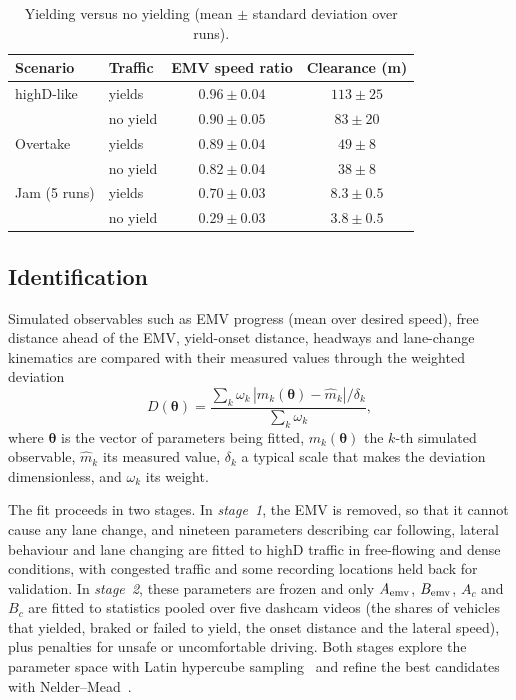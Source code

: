 \documentclass[conference,a4paper]{IEEEtran}
\begin{document}
\begin{table}[t]
\caption{Yielding versus no yielding (mean $\pm$ standard deviation over runs).}
\label{tab:res}
\centering\footnotesize\setlength{\tabcolsep}{3pt}
\begin{tabular}{@{}llcc@{}}
\toprule
Scenario & Traffic & EMV speed ratio & Clearance (m)\\
\midrule
highD-like & yields & $0.96\pm0.04$ & $113\pm25$\\
 & no yield & $0.90\pm0.05$ & $83\pm20$\\
Overtake & yields & $0.89\pm0.04$ & $49\pm8$\\
 & no yield & $0.82\pm0.04$ & $38\pm8$\\
Jam (5 runs) & yields & $0.70\pm0.03$ & $8.3\pm0.5$\\
 & no yield & $0.29\pm0.03$ & $3.8\pm0.5$\\
\bottomrule
\end{tabular}
\end{table}

\subsection{Identification}
\label{sec:ident}
Simulated observables such as EMV progress (mean over desired speed), free distance ahead of the EMV, yield-onset distance, headways and lane-change kinematics are compared with their measured values through the weighted deviation
\begin{equation}
D(\boldsymbol\theta)=\frac{\sum_k \omega_k\,|m_k(\boldsymbol\theta)-\hat m_k|/\delta_k}{\sum_k\omega_k},
\label{eq:loss}
\end{equation}
where $\boldsymbol\theta$ is the vector of parameters being fitted, $m_k(\boldsymbol\theta)$ the $k$-th simulated observable, $\hat m_k$ its measured value, $\delta_k$ a typical scale that makes the deviation dimensionless, and $\omega_k$ its weight.

The fit proceeds in two stages. In \emph{stage~1}, the EMV is removed, so that it cannot cause any lane change, and nineteen parameters describing car following, lateral behaviour and lane changing are fitted to highD traffic in free-flowing and dense conditions, with congested traffic and some recording locations held back for validation. In \emph{stage~2}, these parameters are frozen and only $A_{\rm emv}$, $B_{\rm emv}$, $A_c$ and $B_c$ are fitted to statistics pooled over five dashcam videos (the shares of vehicles that yielded, braked or failed to yield, the onset distance and the lateral speed), plus penalties for unsafe or uncomfortable driving. Both stages explore the parameter space with Latin hypercube sampling~\cite{mckay79} and refine the best candidates with Nelder--Mead~\cite{nelder65,punzo21}.
\end{document}
